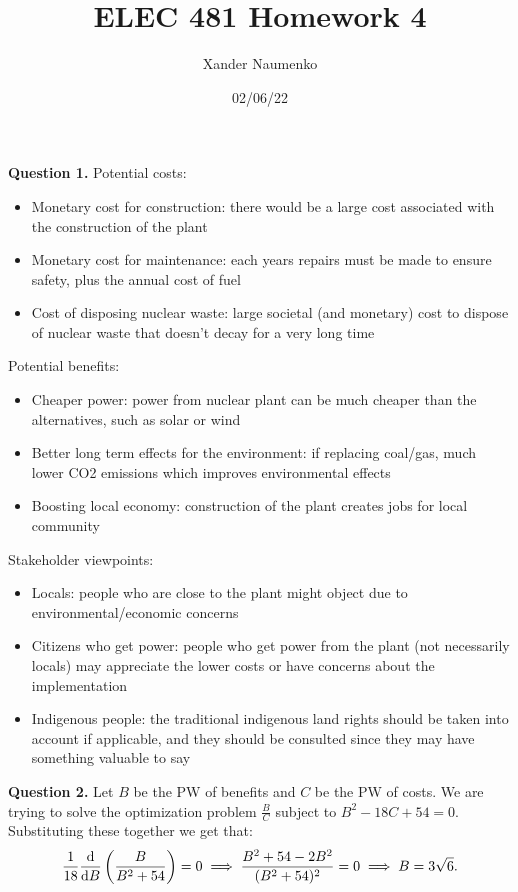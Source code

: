 \documentclass[letterpaper, reqno,11pt]{article}
\begin{document}
\title{ELEC 481 Homework 4}
\date{02/06/22}
\author{Xander Naumenko}
\maketitle

{\noindent\bf Question 1.} Potential costs: 
\begin{itemize}
    \item Monetary cost for construction: there would be a large cost associated with the construction of the plant
    \item Monetary cost for maintenance: each years repairs must be made to ensure safety, plus the annual cost of fuel
    \item Cost of disposing nuclear waste: large societal (and monetary) cost to dispose of nuclear waste that doesn't decay for a very long time
\end{itemize}

Potential benefits: 
\begin{itemize}
    \item Cheaper power: power from nuclear plant can be much cheaper than the alternatives, such as solar or wind
    \item Better long term effects for the environment: if replacing coal/gas, much lower CO2 emissions which improves environmental effects
    \item Boosting local economy: construction of the plant creates jobs for local community
\end{itemize}

Stakeholder viewpoints: 
\begin{itemize}
    \item Locals: people who are close to the plant might object due to environmental/economic concerns
    \item Citizens who get power: people who get power from the plant (not necessarily locals) may appreciate the lower costs or have concerns about the implementation
    \item Indigenous people: the traditional indigenous land rights should be taken into account if applicable, and they should be consulted since they may have something valuable to say
\end{itemize}

{\noindent\bf Question 2.} Let $B$ be the PW of benefits and $C$ be the PW of costs. We are trying to solve the optimization problem $\frac{B}{C}$ subject to $B^2-18C+54=0$. Substituting these together we get that: 
\[
\frac{1}{18}\frac{\text d}{\text dB} \left( \frac{B}{B^2+54} \right) =0\implies \frac{B^2+54-2B^2}{(B^2+54)^2}=0\implies B=3\sqrt{6} 
.\]
\end{document}
